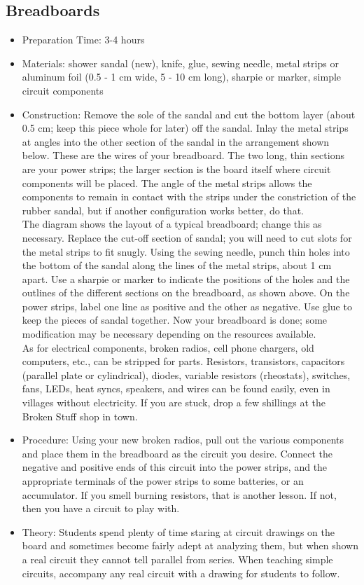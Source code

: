 \subsection{Breadboards}
\begin{itemize}
\item{Preparation Time: 3-4 hours}
\item{Materials: shower sandal (new), knife, glue, sewing needle, metal strips or aluminum foil (0.5 - 1 cm wide, 5 - 10 cm long), sharpie or marker, simple circuit components}
\item{Construction: Remove the sole of the sandal and cut the bottom layer (about 0.5 cm; keep this piece whole for later) off the sandal. Inlay the metal strips at angles into the other section of the sandal in the arrangement shown below. These are the wires of your breadboard. The two long, thin sections are your power strips; the larger section is the board itself where circuit components will be placed. The angle of the metal strips allows the components to remain in contact with the strips under the constriction of the rubber sandal, but if another configuration works better, do that.\\
The diagram shows the layout of a typical breadboard; change this as necessary. Replace the cut-off section of sandal; you will need to cut slots for the metal strips to fit snugly. Using the sewing needle, punch thin holes into the bottom of the sandal along the lines of the metal strips, about 1 cm apart. Use a sharpie or marker to indicate the positions of the holes and the outlines of the different sections on the breadboard, as shown above. On the power strips, label one line as positive and the other as negative. Use glue to keep the pieces of sandal together. Now your breadboard is done; some modification may be necessary depending on the resources available.\\
As for electrical components, broken radios, cell phone chargers, old computers, etc., can be stripped for parts. Resistors, transistors, capacitors (parallel plate or cylindrical), diodes, variable resistors (rheostats), switches, fans, LEDs, heat syncs, speakers, and wires can be found easily, even in villages without electricity. If you are stuck, drop a few shillings at the Broken Stuff shop in town.}
\item{Procedure: Using your new broken radios, pull out the various components and place them in the breadboard as the circuit you desire. Connect the negative and positive ends of this circuit into the power strips, and the appropriate terminals of the power strips to some batteries, or an accumulator. If you smell burning resistors, that is another lesson. If not, then you have a circuit to play with.}
\item{Theory: Students spend plenty of time staring at circuit drawings on the board and sometimes become fairly adept at analyzing them, but when shown a real circuit they cannot tell parallel from series. When teaching simple circuits, accompany any real circuit with a drawing for students to follow.}
\end{itemize}


